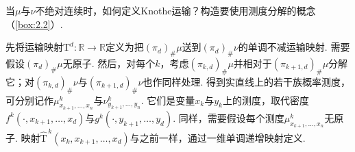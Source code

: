 \begin{remark}\label{obj:2.21}
当$\mu$与$\nu$不绝对连续时，如何定义Knothe运输？构造要使用测度分解的概念（\autoref{box:2.2}）.

先将运输映射$\mathrm T^d:\mathbb R\to\mathbb R$定义为把$(\pi_d)_\#\mu$送到$(\pi_d)_\#\nu$的单调不减运输映射. 需要假设$(\pi_d)_\#\mu$无原子. 然后，对每个$k$，考虑$(\pi_{k,d})_\#\mu$并相对于$(\pi_{k+1,d})_\#\mu$分解它；对$(\pi_{k,d})_\#\nu$与$(\pi_{k+1,d})_\#\nu$也作同样处理. 得到实直线上的若干族概率测度，可分别记作$\mu^k_{x_{k+1},\ldots,x_n}$与$\nu^k_{y_{k+1},\ldots,y_n}$. 它们是变量$x_k$与$y_k$上的测度，取代密度$f^k(\cdot,x_{k+1},\ldots,x_d)$与$g^k(\cdot,y_{k+1},\ldots,y_d)$. 同样，需要假设每个测度$\mu^k_{x_{k+1},\ldots,x_n}$无原子. 映射$\widehat{\mathrm T}^{\,k}(x_k,x_{k+1},\ldots,x_d)$与之前一样，通过一维单调递增映射定义.
\end{remark}
